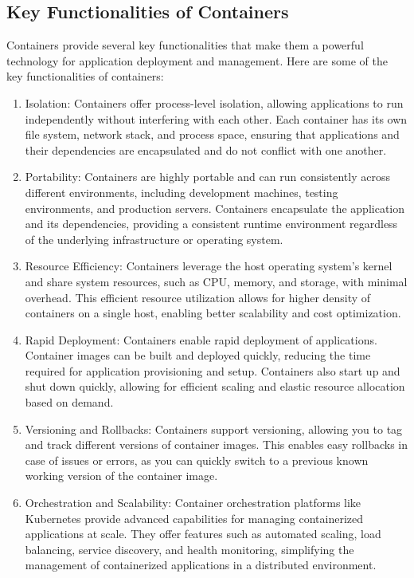 \subsection*{Key Functionalities of Containers}

Containers provide several key functionalities that make them a powerful technology for application deployment and management. Here are some of the key functionalities of containers:

\begin{enumerate}


    \item Isolation: Containers offer process-level isolation, allowing applications to run independently without interfering with each other. Each container has its own file system, network stack, and process space, ensuring that applications and their dependencies are encapsulated and do not conflict with one another.

    \item Portability: Containers are highly portable and can run consistently across different environments, including development machines, testing environments, and production servers. Containers encapsulate the application and its dependencies, providing a consistent runtime environment regardless of the underlying infrastructure or operating system.

    \item Resource Efficiency: Containers leverage the host operating system's kernel and share system resources, such as CPU, memory, and storage, with minimal overhead. This efficient resource utilization allows for higher density of containers on a single host, enabling better scalability and cost optimization.

    \item Rapid Deployment: Containers enable rapid deployment of applications. Container images can be built and deployed quickly, reducing the time required for application provisioning and setup. Containers also start up and shut down quickly, allowing for efficient scaling and elastic resource allocation based on demand.

    \item Versioning and Rollbacks: Containers support versioning, allowing you to tag and track different versions of container images. This enables easy rollbacks in case of issues or errors, as you can quickly switch to a previous known working version of the container image.

    \item Orchestration and Scalability: Container orchestration platforms like Kubernetes provide advanced capabilities for managing containerized applications at scale. They offer features such as automated scaling, load balancing, service discovery, and health monitoring, simplifying the management of containerized applications in a distributed environment.


\end{enumerate}
